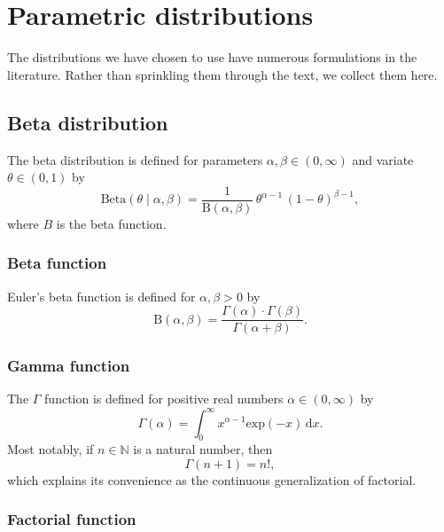 \documentclass[11pt]{report}
\begin{document}
  


\nocite{aitchison1982statistical}
\nocite{gelman2012we}

\clearpage
{}
{}


\appendix

\chapter{Parametric distributions}\label{chap:distributions}

The distributions we have chosen to use have numerous formulations in
the literature.  Rather than sprinkling them through the text, we
collect them here.

\section{Beta distribution}\label{sec:beta-distribution}

The beta distribution is defined for parameters $\alpha, \beta \in (0,
\infty)$ and variate $\theta \in (0, 1)$ by
\[
  \textrm{Beta}(\theta \mid \alpha, \beta)
  = \frac{1}{\textrm{B}(\alpha, \beta)}
  \, \theta^{\alpha - 1}
  \, (1 - \theta)^{\beta - 1},
\]
where $B$ is the beta function.

\subsection{Beta function}

Euler's beta function is defined for $\alpha, \beta > 0$ by
\[
  \textrm{B}(\alpha, \beta)
  = \frac{\Gamma(\alpha) \cdot \Gamma(\beta)}
         {\Gamma(\alpha + \beta)}.
\]

\subsection{Gamma function}

The $\Gamma$ function is defined for positive real numbers $\alpha \in
(0, \infty)$ by
\[
  \Gamma(\alpha) = \int_0^{\infty} x^{\alpha - 1} \textrm{exp}(-x) \, \textrm{d}x.
\]
Most notably, if $n \in \mathbb{N}$ is a natural number, then
\[
  \Gamma(n + 1) = n!,
\]
which explains its convenience as the continuous generalization of
factorial.

\subsection{Factorial function}
\end{document}
